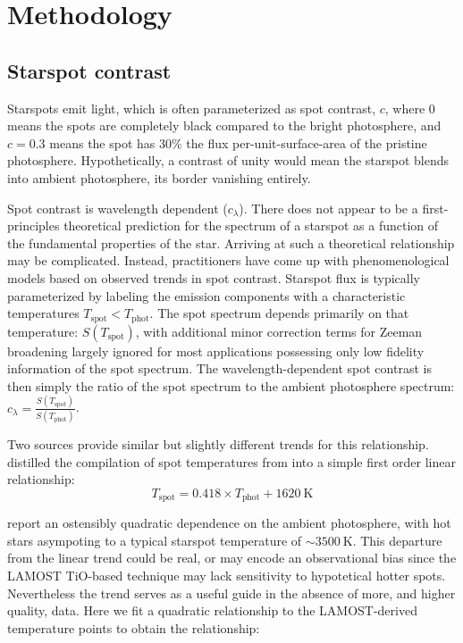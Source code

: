 \documentclass[twocolumn]{aastex631}
\begin{document}
\section{Methodology}

\subsection{Starspot contrast}
Starspots emit light, which is often parameterized as spot contrast, $c$, where $0$ means the spots are completely black compared to the bright photosphere, and $c=0.3$ means the spot has 30\% the flux per-unit-surface-area of the pristine photosphere.  Hypothetically, a contrast of unity would mean the starspot blends into ambient photosphere, its border vanishing entirely.

Spot contrast is wavelength dependent ($c_\lambda$).  There does not appear to be a first-principles theoretical prediction for the spectrum of a starspot as a function of the fundamental properties of the star.  Arriving at such a theoretical relationship may be complicated.  Instead, practitioners have come up with phenomenological models based on observed trends in spot contrast.  Starspot flux is typically parameterized by labeling the emission components with a characteristic temperatures
$T_\mathrm{spot}<T_\mathrm{phot}$.  The spot spectrum depends primarily on that temperature: $S(T_\mathrm{spot})$, with additional minor correction terms for Zeeman broadening largely ignored for most applications possessing only low fidelity information of the spot spectrum.  The wavelength-dependent spot contrast is then simply the ratio of the spot spectrum to the ambient photosphere spectrum:  $c_\lambda = \frac{S(T_\mathrm{spot})}{ S(T_\mathrm{phot})}$.

Two sources provide similar but slightly different trends for this relationship.  \citet{2019AJ....157...96R} distilled the compilation of spot temperatures from \citet{2005LRSP....2....8B} into a simple first order linear relationship:
\begin{equation}
  T_{\mathrm{spot}} = 0.418 \times T_{\mathrm{phot}} + 1620~\mathrm{K}
  \label{eq:Tspot}
\end{equation}

\citet{2016MNRAS.463.2494F} report an ostensibly quadratic dependence on the ambient photosphere, with hot stars asympoting to a typical starspot temperature of $\sim3500~\mathrm{K}$.  This departure from the linear trend could be real, or may encode an observational bias since the LAMOST TiO-based technique may lack sensitivity to hypotetical hotter spots.  Nevertheless the trend serves as a useful guide in the absence of more, and higher quality, data.  Here we fit a quadratic relationship to the \citet{2016MNRAS.463.2494F} LAMOST-derived temperature points to obtain the relationship:
\end{document}
